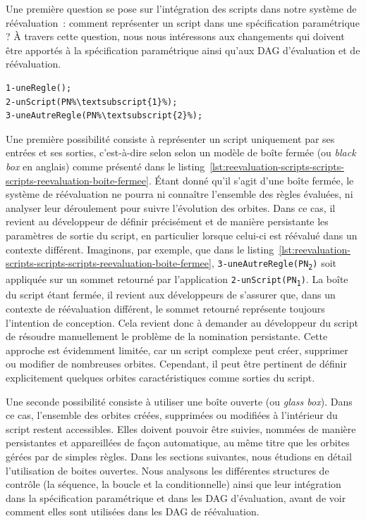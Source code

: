 Une première question se pose sur l'intégration des scripts dans notre système
de réévaluation~: comment représenter un script dans une spécification
paramétrique ? %
À travers cette question, nous nous intéressons aux changements qui doivent être apportés à la spécification paramétrique ainsi qu'aux DAG d'évaluation et de réévaluation. %
\begin{lstlisting}[style=script-style,
escapechar=\%,
caption=Exemple de spécification «~boîte fermée~»,
label=lst:reevaluation-scripts-scripts-scripts-reevaluation-boite-fermee]
1-uneRegle();
2-unScript(PN%\textsubscript{1}%);
3-uneAutreRegle(PN%\textsubscript{2}%);
\end{lstlisting}
Une première possibilité consiste à représenter un script uniquement par ses entrées et
ses sorties, c'est-à-dire selon selon un modèle de boîte fermée (ou
\textit{black box} en anglais) comme présenté dans
le listing~\ref{lst:reevaluation-scripts-scripts-scripts-reevaluation-boite-fermee}.
%
Étant donné qu'il s'agit d'une boîte fermée, le système de réévaluation ne pourra ni connaître l'ensemble des règles évaluées, ni analyser leur déroulement pour suivre l'évolution des orbites. %
Dans ce cas, il revient au développeur de définir précisément et de manière persistante les paramètres de sortie du script, en particulier lorsque celui-ci est réévalué dans un contexte différent. %
Imaginons, par exemple, que dans le
listing~\ref{lst:reevaluation-scripts-scripts-scripts-reevaluation-boite-fermee},
\texttt{3\allowbreak{}-\allowbreak{}uneAutreRegle(\allowbreak{}PN\textsubscript{2})} soit
appliquée sur un sommet retourné par l'application
\texttt{2\allowbreak{}-\allowbreak{}unScript(\allowbreak{}PN\textsubscript{1})}. %
La boîte du script étant fermée, il revient aux développeurs de s'assurer que, dans un contexte de réévaluation différent, le sommet retourné représente toujours l'intention de conception. %
Cela revient donc à demander au développeur du script de résoudre manuellement le problème de la nomination persistante. %
Cette approche est évidemment limitée, car un script complexe peut créer, supprimer ou modifier de nombreuses orbites. Cependant, il peut être pertinent de définir explicitement quelques orbites caractéristiques comme sorties du script.

Une seconde possibilité consiste à utiliser une boîte ouverte (ou \textit{glass
	box}). %
Dans ce cas, l'ensemble des orbites créées, supprimées ou modifiées à
l'intérieur du script restent accessibles. %
Elles doivent pouvoir être suivies, nommées de manière persistantes et
appareillées de façon automatique, au même titre que les orbites gérées par de
simples règles. %
Dans les sections suivantes, nous étudions en détail l'utilisation de boites
ouvertes. %
Nous analysons les différentes structures de contrôle (la séquence, la boucle et la conditionnelle) ainsi que leur intégration dans la spécification paramétrique et dans les DAG d'évaluation, avant de voir comment elles sont utilisées dans les DAG de réévaluation.




